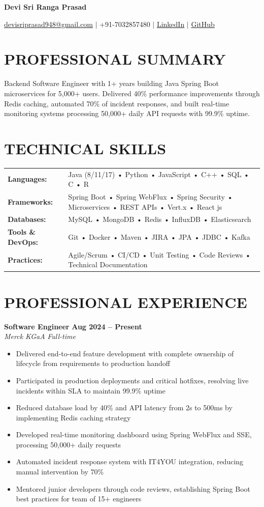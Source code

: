 \documentclass[10pt,a4paper]{article}
\newcommand{\compactheader}[5]{%
    {\centering\Large\bfseries #1\par}
    \vspace{2pt}
    {\centering\small
    \href{mailto:#2}{#2} $|$ #3 $|$ \href{#4}{LinkedIn} $|$ \href{#5}{GitHub}
    \par}
    \vspace{4pt}
}
\newcommand{\experience}[4]{%
    \textbf{#1} \hfill \textbf{#2}\\
    \textit{#3} \hfill \textit{#4}\vspace{1pt}%
}
\begin{document}
\compactheader{Devi Sri Ranga Prasad}{devisriprasad948@gmail.com}{+91-7032857480}{https://www.linkedin.com/in/gudimetla-devi-sri-ranga-prasad}{https://github.com/dspStudent}

\section*{PROFESSIONAL SUMMARY}
Backend Software Engineer with 1+ years building Java Spring Boot microservices for 5,000+ users. Delivered 40\% performance improvements through Redis caching, automated 70\% of incident responses, and built real-time monitoring systems processing 50,000+ daily API requests with 99.9\% uptime.

\section*{TECHNICAL SKILLS}
\begin{tabularx}{\textwidth}{@{}l X@{}}
\textbf{Languages:} & Java (8/11/17) • Python • JavaScript • C++ • SQL • C • R\\[1pt]
\textbf{Frameworks:} & Spring Boot • Spring WebFlux • Spring Security • Microservices • REST APIs • Vert.x • React js\\[1pt]
\textbf{Databases:} & MySQL • MongoDB • Redis • InfluxDB • Elasticsearch \\[1pt]
\textbf{Tools \& DevOps:} & Git • Docker • Maven • JIRA • JPA • JDBC • Kafka \\[1pt]
\textbf{Practices:} & Agile/Scrum • CI/CD • Unit Testing • Code Reviews • Technical Documentation \\
\end{tabularx}

\section*{PROFESSIONAL EXPERIENCE}

\experience{Software Engineer}{Aug 2024 -- Present}{Merck KGaA}{Full-time}
\begin{itemize}[leftmargin=1.3em, itemsep=0pt, parsep=0pt, topsep=1pt]
    \item Delivered end-to-end feature development with complete ownership of lifecycle from requirements to production handoff
    \item Participated in production deployments and critical hotfixes, resolving live incidents within SLA to maintain 99.9\% uptime
    \item Reduced database load by 40\% and API latency from 2s to 500ms by implementing Redis caching strategy
    \item Developed real-time monitoring dashboard using Spring WebFlux and SSE, processing 50,000+ daily requests
    \item Automated incident response system with IT4YOU integration, reducing manual intervention by 70\%
    \item Mentored junior developers through code reviews, establishing Spring Boot best practices for team of 15+ engineers
\end{itemize}
\end{document}
